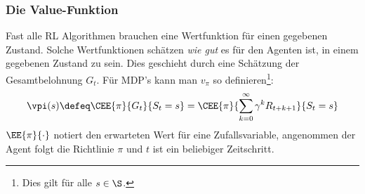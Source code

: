 \documentclass[a4paper,titlepage]{article}
\numberwithin{equation}{section} %
\begin{document}
\subsubsection{Die Value-Funktion}
Fast alle RL Algorithmen brauchen eine Wertfunktion für einen gegebenen Zustand. Solche Wertfunktionen schätzen \emph{wie gut} es für den Agenten ist, in einem gegebenen Zustand zu sein. Dies geschieht durch eine Schätzung der Gesamtbelohnung $G_t$. Für MDP's kann man $v_{\pi}$ so definieren\footnote{Dies gilt für alle $s \in \S$.}\cite{suttonReinforcementLearningIntroduction2018}:
\begin{equation} \label{eqn:value_definition}
	\vpi(s) \defeq \CEE{\pi}{G_t}{S_t=s} = \CEE{\pi}{\sum_{k=0}^{\infty}\gamma^{k}R_{t+k+1}}{S_t=s}
\end{equation}
$\EE{\pi}{\cdot}$ notiert den erwarteten Wert für eine Zufallsvariable, angenommen der Agent folgt die Richtlinie $\pi$ und $t$ ist ein beliebiger Zeitschritt.
\end{document}
